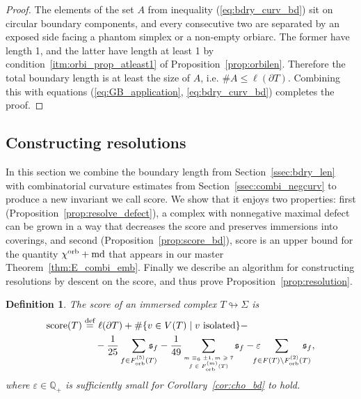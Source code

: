 \documentclass{amsart}
\newtheorem{definition}[conjecture]{Definition}
\newcommand{\cho}{\chi^{\textnormal{orb}}}
\newcommand{\defeq}{\stackrel{\tn{def}}{=}}
\newcommand{\Forb}[1][m]{F^{(#1)}_{\textnormal{orb}}}
\newcommand{\md}{\textnormal{md}}
\newcommand{\tn}{\textnormal}
\begin{document}
\begin{proof}
The elements of the set $A$ from inequality (\ref{eq:bdry_curv_bd}) sit on circular boundary components, and every consecutive two are separated by an exposed side facing a phantom simplex or a non-empty orbiarc. The former have length 1, and the latter have length at least 1 by condition~\ref*{itm:orbi_prop_atleast1} of Proposition~\ref{prop:orbilen}. Therefore the total boundary length is at least the size of $A$, i.e. $\#A\leqslant\ell(\partial T)$. Combining this with equations (\ref{eq:GB_application}, \ref{eq:bdry_curv_bd}) completes the proof.
\end{proof}

\subsection{Constructing resolutions}\label{ssec:construct_resolution}

In this section we combine the boundary length from Section~\ref{ssec:bdry_len} with combinatorial curvature estimates from Section~\ref{ssec:combi_negcurv} to produce a new invariant we call score. We show that it enjoys two properties: first (Proposition~\ref{prop:resolve_defect}), a complex with nonnegative maximal defect can be grown in a way that decreases the score and preserves immersions into coverings, and second (Proposition~\ref{prop:score_bd}), score is an upper bound for the quantity $\cho+\md$ that appears in our master Theorem~\ref{thm:E_combi_emb}. Finally we describe an algorithm for constructing resolutions by descent on the score, and thus prove Proposition~\ref{prop:resolution}.
\begin{definition}\label{def:score}
The \emph{score} of an immersed complex $T\looparrowright\Sigma$ is
\begin{align*}
\tn{score}(T)\defeq&\ \ell(\partial T)+\#\{v\in V(T)\mid v\text{ isolated}\}-\\
&-\frac{1}{25}\sum_{f\in\Forb[5](T)}\hspace*{-10pt}\mathfrak{s}_f-\frac{1}{49}\sum_{\tiny\begin{matrix}m\equiv_6\pm1,m\geqslant7\\f\in\Forb(T)\end{matrix}}\mathfrak{s}_f-\varepsilon\hspace*{-10pt}\sum_{f\in F(T)\setminus\Forb[2](T)}\hspace*{-10pt}\mathfrak{s}_f,
\end{align*}
where $\varepsilon\in\mathbb{Q}_+$ is sufficiently small for Corollary~\ref{cor:cho_bd} to hold.
\end{definition}
\end{document}
